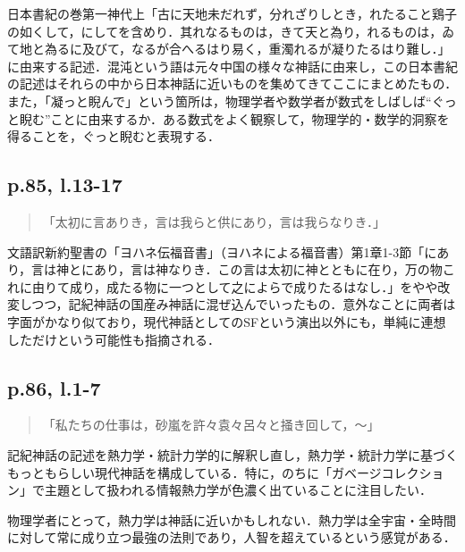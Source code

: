 \documentclass[10pt, a5paper, twoside]{ltjsarticle}
\begin{document}
            日本書紀の巻第一神代上「古に天地未だれず，分れざりしとき，れたること鶏子の如くして，にしてを含めり．其れなるものは，きて天と為り，れるものは，ゐて地と為るに及びて，なるが合へるはり易く，重濁れるが凝りたるはり難し．」\cite{nihonshoki}に由来する記述．混沌という語は元々中国の様々な神話に由来し，この日本書紀の記述はそれらの中から日本神話に近いものを集めてきてここにまとめたもの．また，「凝っと睨んで」という箇所は，物理学者や数学者が数式をしばしば“ぐっと睨む”ことに由来するか．ある数式をよく観察して，物理学的・数学的洞察を得ることを，ぐっと睨むと表現する．

        \subsection{p.85, l.13-17}

            \begin{quote}
                「太初に言ありき，言は我らと供にあり，言は我らなりき．」
            \end{quote}

            文語訳新約聖書の「ヨハネ伝福音書」（ヨハネによる福音書）第1章1-3節「にあり，言は神とにあり，言は神なりき．この言は太初に神とともに在り，万の物これに由りて成り，成たる物に一つとして之によらで成りたるはなし．」\cite{bible}をやや改変しつつ，記紀神話の国産み神話に混ぜ込んでいったもの．意外なことに両者は字面がかなり似ており，現代神話としてのSFという演出以外にも，単純に連想しただけという可能性も指摘される．

        \subsection{p.86, l.1-7}

            \begin{quote}
                「私たちの仕事は，砂嵐を許々袁々呂々と掻き回して，〜」
            \end{quote}

            記紀神話の記述を熱力学・統計力学的に解釈し直し，熱力学・統計力学に基づくもっともらしい現代神話を構成している．特に，のちに「ガベージコレクション」で主題として扱われる情報熱力学が色濃く出ていることに注目したい．

            物理学者にとって，熱力学は神話に近いかもしれない．熱力学は全宇宙・全時間に対して常に成り立つ最強の法則であり，人智を超えているという感覚がある．
\end{document}
